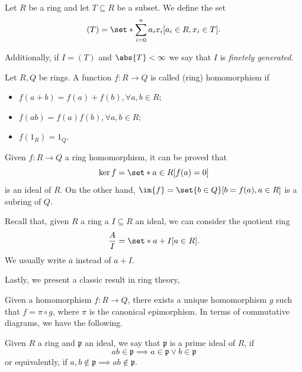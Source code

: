 \documentclass{subfiles}
\begin{document}
    \begin{definition*}
        Let \(R\) be a ring and let \(T \subseteq R\) be a subset. 
            We define the set 
            \[
                (T) = \set*{\sum_{i = 0}^{n} a_{i}x_{i}}[a_{i} \in R, x_{i} \in T].
            \]

        Additionally, if \(I = (T)\) and \(\abs{T} < \infty\) we say that \(I\)
            is \emph{finetely generated}.
    \end{definition*}

    \begin{definition*}
        Let \(R, Q\) be rings. A function \(f : R \to Q\) is called (ring) homomorphism
            if 
            \begin{itemize}
                \item \(f(a + b) = f(a) + f(b), \forall a, b \in R\); \\ 
                \item \(f(ab) = f(a)f(b), \forall a, b \in R\); \\ 
                \item \(f(1_{R}) = 1_{Q}\).
            \end{itemize}
    \end{definition*}

    \begin{remark*}
        Given \(f : R \to Q\) a ring homomorphism, it can be proved that 
            \[
                \ker{f} = \set*{a \in R}[f(a) = 0]
            \]
            is an ideal of \(R\). On the other hand, 
            \(\im{f} = \set{b \in Q}[b = f(a), a \in R]\) is a subring of \(Q\).
    \end{remark*}

    Recall that, given \(R\) a ring a \(I \subseteq R\) an ideal, 
        we can consider the quotient ring 
        \[
            \frac{A}{I} = \set*{a + I}[a \in R].
        \]
        We usually write \(\overline{a}\) instead of \(a + I\).

    Lastly, we present a classic result in ring theory,
    \begin{theorem*}
        Given a homomorphism \(f : R \to Q\), there exists a unique homomorphism \(g\)
        such that \(f = \pi \circ g\), where \(\pi\) is the canonical epimorphism.
        In terms of commutative diagrams, we have the following.
        
    \end{theorem*}

    \begin{proposition*}
        Given \(R\) a ring and \(\mathfrak{p}\) an ideal, we say that \(\mathfrak{p}\)
        is a prime ideal of \(R\), if 
        \[
            ab \in \mathfrak{p} \implies a \in \mathfrak{p} \lor b \in \mathfrak{p}
        \]
        or equivalently, if \(a, b \notin \mathfrak{p} \implies ab \notin \mathfrak{p}\).
    \end{proposition*}
\end{document}
